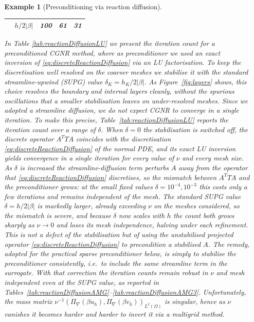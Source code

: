 \documentclass[hidelinks,onefignum,onetabnum]{siamart220329}
\newcommand{\bb}[1]{#1}
\newtheorem{example}{Example}
\begin{document}
\begin{example}[Preconditioning via reaction diffusion]
\begin{table}
\begin{tabular}{c|c|c|c|c}
                                & $h/2|\beta|$ & 100 & 61 & 31 \\
            \bottomrule
        \end{tabular}
    \end{table}
    In Table \ref{tab:reactionDiffusionLU} we present the iteration count for a preconditioned CGNR method, where as preconditioner we used an exact inversion of \eqref{eq:discreteReactionDiffusion} via an LU factorisation.
    \bb{To keep the discretisation well resolved on the coarser meshes we stabilise it with the standard streamline-upwind (SUPG) value $\delta_K = h_K/2|\beta|$. As Figure~\ref{fig:layers} shows, this choice resolves the boundary and internal layers cleanly, without the spurious oscillations that a smaller stabilisation leaves on under-resolved meshes.}
    Since we adopted a streamline diffusion, we do not expect CGNR to converge in a single iteration.
    \bb{To make this precise, Table~\ref{tab:reactionDiffusionLU} reports the iteration count over a range of $\delta$. When $\delta = 0$ the stabilisation is switched off, the discrete operator $A^T T A$ coincides with the discretisation \eqref{eq:discreteReactionDiffusion} of the normal PDE, and its exact LU inversion yields convergence in a single iteration for every value of $\nu$ and every mesh size. As $\delta$ is increased the streamline-diffusion term perturbs $A$ away from the operator that \eqref{eq:discreteReactionDiffusion} discretises, so the mismatch between $A^T T A$ and the preconditioner grows: at the small fixed values $\delta = 10^{-4}, 10^{-3}$ this costs only a few iterations and remains independent of the mesh. The standard SUPG value $\delta = h/2|\beta|$ is markedly larger, already exceeding $\nu$ on the meshes considered, so the mismatch is severe, and because $\delta$ now scales with $h$ the count both grows sharply as $\nu\to0$ and loses its mesh independence, halving under each refinement.}
    \bb{This is not a defect of the stabilisation but of using the \emph{unstabilised} projected operator \eqref{eq:discreteReactionDiffusion} to precondition a stabilised $A$. The remedy, adopted for the practical sparse preconditioner below, is simply to stabilise the preconditioner consistently, i.e.~to include the same streamline term in the surrogate. With that correction the iteration counts remain robust in $\nu$ and mesh independent even at the SUPG value, as reported in Tables~\ref{tab:reactionDiffusionAMG}--\ref{tab:reactionDiffusionAMG3}.}
    Unfortunately, the mass matrix $\nu^{-1}(\Pi_{\nabla}(\beta u_h),\Pi_{\nabla}(\beta v_h))_{L^2(\Omega)}$ is singular, hence as $\nu$ vanishes it becomes harder and harder to invert it via a multigrid method.

\end{example}
\end{document}
